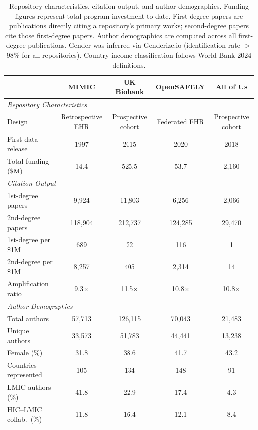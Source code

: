 \begin{table}[H]
\centering
\caption{Repository characteristics, citation output, and author demographics. Funding figures represent total program investment to date. First-degree papers are publications directly citing a repository's primary works; second-degree papers cite those first-degree papers. Author demographics are computed across all first-degree publications. Gender was inferred via Genderize.io (identification rate $>$98\% for all repositories). Country income classification follows World Bank 2024 definitions.}
\label{tab:overview}
\small
\begin{tabular}{@{}lcccc@{}}
\toprule
& \textbf{MIMIC} & \textbf{UK Biobank} & \textbf{OpenSAFELY} & \textbf{All of Us} \\
\midrule
\multicolumn{5}{l}{\textit{Repository Characteristics}} \\[3pt]
Design & Retrospective EHR & Prospective cohort & Federated EHR & Prospective cohort \\
First data release & 1997 & 2015 & 2020 & 2018 \\
Total funding (\$M) & 14.4 & 525.5 & 53.7 & 2,160 \\
\midrule
\multicolumn{5}{l}{\textit{Citation Output}} \\[3pt]
1st-degree papers & 9,924 & 11,803 & 6,256 & 2,066 \\
2nd-degree papers & 118,904 & 212,737 & 124,285 & 29,470 \\
1st-degree per \$1M & 689 & 22 & 116 & 1 \\
2nd-degree per \$1M & 8,257 & 405 & 2,314 & 14 \\
Amplification ratio & 9.3$\times$ & 11.5$\times$ & 10.8$\times$ & 10.8$\times$ \\
\midrule
\multicolumn{5}{l}{\textit{Author Demographics}} \\[3pt]
Total authors & 57,713 & 126,115 & 70,043 & 21,483 \\
Unique authors & 33,573 & 51,783 & 44,441 & 13,238 \\
Female (\%) & 31.8 & 38.6 & 41.7 & 43.2 \\
Countries represented & 105 & 134 & 148 & 91 \\
LMIC authors (\%) & 41.8 & 22.9 & 17.4 & 4.3 \\
HIC--LMIC collab.\ (\%) & 11.8 & 16.4 & 12.1 & 8.4 \\
\bottomrule
\end{tabular}
\end{table}
